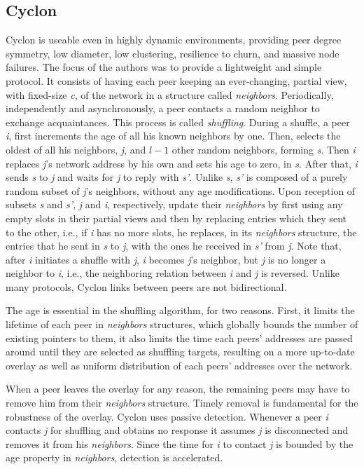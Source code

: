\documentclass[runningheads]{llncs}
\begin{document}
\subsection{Cyclon} Cyclon\cite{cyclon} is useable even in highly dynamic environments, providing peer degree symmetry, low diameter, low clustering, resilience to churn, and massive node failures. The focus of the authors was to provide a lightweight and simple protocol. It consists of having each peer keeping an ever-changing, partial view, with fixed-size \textit{c}, of the network in a structure called \textit{neighbors}. Periodically, independently and asynchronously, a peer contacts a random neighbor to exchange acquaintances. This process is called \textit{shuffling}. During a shuffle, a peer \textit{i}, first increments the age of all his known neighbors by one. Then, selects the oldest of all his neighbors, \textit{j}, and $l-1$ other random neighbors, forming \textit{s}. Then \textit{i} replaces \textit{j}'s network address by his own and sets his age to zero, in \textit{s}. After that, \textit{i} sends \textit{s} to \textit{j} and waits for \textit{j} to reply with \textit{s'}. Unlike \textit{s}, \textit{s'} is composed of a purely random subset of \textit{j}'s neighbors, without any age modifications. Upon reception of subsets \textit{s} and \textit{s'}, \textit{j} and \textit{i}, respectively, update their \textit{neighbors} by first using any empty slots in their partial views and then by replacing entries which they sent to the other, i.e., if \textit{i} has no more slots, he replaces, in its \textit{neighbors} structure, the entries that he sent in \textit{s} to \textit{j}, with the ones he received in \textit{s'} from \textit{j}. Note that, after \textit{i} initiates a shuffle with \textit{j}, \textit{i} becomes \textit{j}'s neighbor, but \textit{j} is no longer a neighbor to \textit{i}, i.e., the neighboring relation between \textit{i} and \textit{j} is reversed. Unlike many protocols, Cyclon links between peers are not bidirectional.

The age is essential in the shuffling algorithm, for two reasons. First, it limits the lifetime of each peer in \textit{neighbors} structures, which globally bounds the number of existing pointers to them, it also limits the time each peers' addresses are passed around until they are selected as shuffling targets, resulting on a more up-to-date overlay as well as uniform distribution of each peers' addresses over the network.

When a peer leaves the overlay for any reason, the remaining peers may have to remove him from their \textit{neighbors} structure. Timely removal is fundamental for the robustness of the overlay.  Cyclon uses passive detection. Whenever a peer \textit{i} contacts \textit{j} for shuffling and obtains no response it assumes \textit{j} is disconnected and removes it from his \textit{neighbors}. Since the time for \textit{i} to contact \textit{j} is bounded by the age property in \textit{neighbors}, detection is accelerated.
\end{document}
